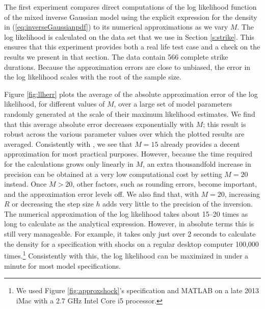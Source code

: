 The first experiment compares direct computations of the log likelihood function of the mixed inverse Gaussian model using the explicit expression for the density in (\ref{eq:inverseGaussianpdf}) to its numerical approximations as we vary $M$. The log likelihood is calculated on the data set that we use in Section \ref{s:strike}. This ensures that this experiment  provides both a real life test case and a check on the results we present in that section. The data contain 566 complete strike durations. Because the approximation errors are close to unbiased, the error in the log likelihood scales with the root of the sample size.

Figure \ref{fig:llherr} plots the average of the absolute approximation error of the log likelihood, for different values of $M$, over a large set of model parameters randomly generated at the scale of their maximum likelihood estimates. We find that this average absolute error decreases exponentially with $M$; this result is robust across the various parameter values over which the plotted results are averaged.
Consistently with \citet{japr00:rogers}, we see that $M=15$ already provides a decent approximation for most practical purposes. However, because the time required for the calculations grows only linearly in $M$, an extra thousandfold increase in precision can be obtained at a very low computational cost by setting $M=20$ instead. Once $M>20$, other factors, such as rounding errors, become important, and the approximation error levels off. We also find that, with $M=20$, increasing $R$ or decreasing the step size $h$ adds very little to the precision of the inversion. The numerical approximation of the log likelihood takes about 15--20 times as long to calculate as the analytical expression. However, in absolute terms this is still very manageable. For example, it takes only just over 2 seconds to calculate the density for a specification with shocks on a regular desktop computer 100,000 times.\footnote{We used Figure \ref{fig:approxshock}'s specification and MATLAB on a late 2013 iMac with a 2.7 GHz Intel Core i5 processor.}  Consistently with this, the log likelihood can be maximized in under a minute for most model specifications. 

